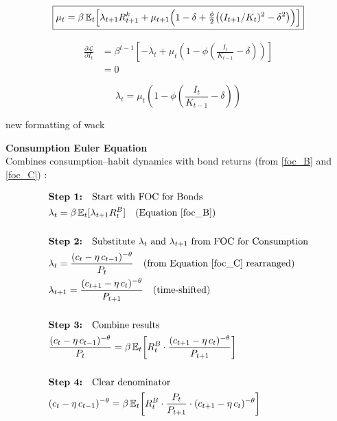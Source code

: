 \documentclass[11pt,preprint]{elsarticle}
\numberwithin{equation}{section}
\numberwithin{figure}{section}
\numberwithin{table}{section}
\begin{document}
\begin{equation}\label{foc_K}
  \boxed{%
    \mu_t
    = \beta\,\mathbb{E}_t\Bigl[
        \lambda_{t+1}R^k_{t+1}
      + \mu_{t+1}\Bigl(
          1-\delta
        + \tfrac{\phi}{2}\bigl((I_{t+1}/K_t)^2 - \delta^2\bigr)
      \Bigr)
    \Bigr]
  }
\end{equation}

\begin{align*}
\frac{\partial \mathcal{L}}{\partial I_t}
&= \beta^{t-1} \left[ 
   -\lambda_t 
   + \mu_t \left( 
        1 
        - \phi \left( \frac{I_t}{K_{t-1}} - \delta \right) 
     \right)
\right] \\
&= 0
\end{align*}

\begin{equation}\label{foc_I}
\boxed{
  \lambda_t 
  = \mu_t 
    \left( 1 
      - \phi 
        \left( \frac{I_t}{K_{t-1}} - \delta \right)
    \right)
}
\end{equation}

\newpage

new formatting of wack

\textbf{Consumption Euler Equation}\\
Combines consumption--habit dynamics with bond returns (from
\eqref{foc_B} and \eqref{foc_C}) :

\begin{align*}
& \textbf{Step 1:} \quad \text{Start with FOC for Bonds} \\
& \lambda_t = \beta\,\mathbb{E}_t[\lambda_{t+1}R_t^B] \quad \text{(Equation \ref{foc_B})} \\
& \\
& \textbf{Step 2:} \quad \text{Substitute } \lambda_t \text{ and } \lambda_{t+1} \text{ from FOC for Consumption} \\
& \lambda_t = \frac{(c_t - \eta\,c_{t-1})^{-\theta}}{P_t} \quad \text{(from Equation \ref{foc_C} rearranged)} \\
& \lambda_{t+1} = \frac{(c_{t+1} - \eta\,c_t)^{-\theta}}{P_{t+1}} \quad \text{(time-shifted)} \\
& \\
& \textbf{Step 3:} \quad \text{Combine results} \\
& \frac{(c_t - \eta\,c_{t-1})^{-\theta}}{P_t} = \beta\,\mathbb{E}_t\!\left[ R_t^B \cdot \frac{(c_{t+1} - \eta\,c_t)^{-\theta}}{P_{t+1}} \right] \\
& \\
& \textbf{Step 4:} \quad \text{Clear denominator} \\
& (c_t - \eta\,c_{t-1})^{-\theta} = \beta\,\mathbb{E}_t\!\left[ R_t^B \cdot \frac{P_t}{P_{t+1}} \cdot (c_{t+1} - \eta\,c_t)^{-\theta} \right]
\end{align*}
\end{document}
